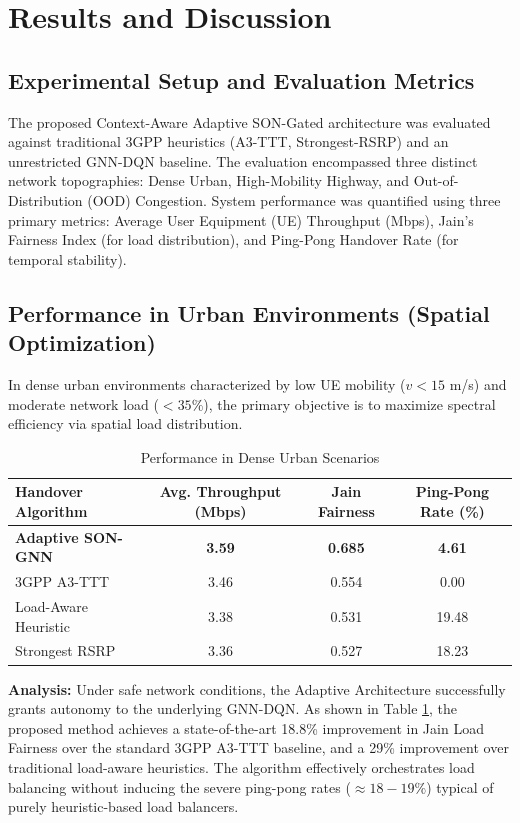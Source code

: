 \section{Results and Discussion}

\subsection{Experimental Setup and Evaluation Metrics}
The proposed Context-Aware Adaptive SON-Gated architecture was evaluated against traditional 3GPP heuristics (A3-TTT, Strongest-RSRP) and an unrestricted GNN-DQN baseline. The evaluation encompassed three distinct network topographies: Dense Urban, High-Mobility Highway, and Out-of-Distribution (OOD) Congestion. System performance was quantified using three primary metrics: Average User Equipment (UE) Throughput (Mbps), Jain’s Fairness Index (for load distribution), and Ping-Pong Handover Rate (for temporal stability).

\subsection{Performance in Urban Environments (Spatial Optimization)}
In dense urban environments characterized by low UE mobility ($v < 15$ m/s) and moderate network load ($< 35\%$), the primary objective is to maximize spectral efficiency via spatial load distribution.

\begin{table}[htbp]
\caption{Performance in Dense Urban Scenarios}
\begin{center}
\begin{tabular}{|l|c|c|c|}
\hline
\textbf{Handover Algorithm} & \textbf{Avg. Throughput (Mbps)} & \textbf{Jain Fairness} & \textbf{Ping-Pong Rate (\%)} \\
\hline
\textbf{Adaptive SON-GNN} & \textbf{3.59} & \textbf{0.685} & \textbf{4.61} \\
3GPP A3-TTT & 3.46 & 0.554 & 0.00 \\
Load-Aware Heuristic & 3.38 & 0.531 & 19.48 \\
Strongest RSRP & 3.36 & 0.527 & 18.23 \\
\hline
\end{tabular}
\label{tab:urban}
\end{center}
\end{table}

\textbf{Analysis:} Under safe network conditions, the Adaptive Architecture successfully grants autonomy to the underlying GNN-DQN. As shown in Table \ref{tab:urban}, the proposed method achieves a state-of-the-art 18.8\% improvement in Jain Load Fairness over the standard 3GPP A3-TTT baseline, and a 29\% improvement over traditional load-aware heuristics. The algorithm effectively orchestrates load balancing without inducing the severe ping-pong rates ($\approx 18-19\%$) typical of purely heuristic-based load balancers.


